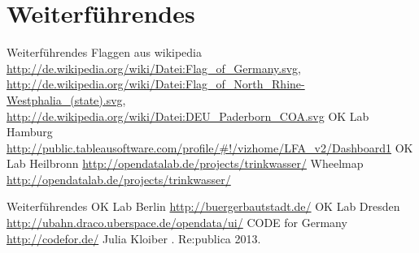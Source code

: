 \section{Weiterführendes}
  \begin{thebibliography}{10}
  \begin{frame}[t]{Weiterführendes}   
    Flaggen aus wikipedia
     \newblock {}
     \newblock \url{http://de.wikipedia.org/wiki/Datei:Flag_of_Germany.svg}, \url{http://de.wikipedia.org/wiki/Datei:Flag_of_North_Rhine-Westphalia_(state).svg}, \url{http://de.wikipedia.org/wiki/Datei:DEU_Paderborn_COA.svg}
    OK Lab Hamburg
    \newblock \url{http://public.tableausoftware.com/profile/\#!/vizhome/LFA_v2/Dashboard1} 
    OK Lab Heilbronn
    \newblock \url{http://opendatalab.de/projects/trinkwasser/}
    Wheelmap
    \newblock \url{http://opendatalab.de/projects/trinkwasser/}
   
\end{frame}


\begin{frame}[t]{Weiterführendes}   
    OK Lab Berlin
    \newblock \url{http://buergerbautstadt.de/}  
    OK Lab Dresden
    \newblock \url{http://ubahn.draco.uberspace.de/opendata/ui/}
    CODE for Germany
    \newblock \url{http://codefor.de/}
    Julia Kloiber
    .
    \newblock Re:publica 2013.
   

   
\end{frame}

  \end{thebibliography}